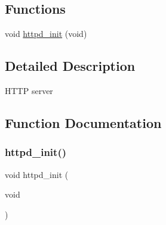 \subsection*{Functions}
\begin{DoxyCompactItemize}
\item 
void \hyperlink{openmote-cc2538_2lwip_2src_2include_2lwip_2apps_2httpd_8h_ac364305cee969a0be43c071722b136e6}{httpd\+\_\+init} (void)
\end{DoxyCompactItemize}


\subsection{Detailed Description}
H\+T\+TP server 

\subsection{Function Documentation}
\mbox{\label{openmote-cc2538_2lwip_2src_2include_2lwip_2apps_2httpd_8h_ac364305cee969a0be43c071722b136e6}} 
\subsubsection{\texorpdfstring{httpd\+\_\+init()}{httpd\_init()}}
{\footnotesize\ttfamily void httpd\+\_\+init (\begin{DoxyParamCaption}\item[{void}]{ }\end{DoxyParamCaption})}

